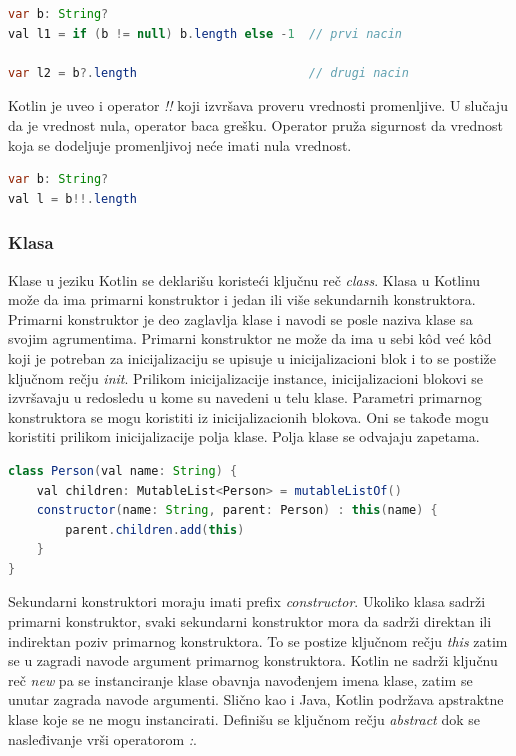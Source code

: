 \documentclass[12pt,oneside]{memoir}
\begin{document}
\begin{lstlisting}[caption={Upravljanje nula vrednostima},captionpos=t, language=Java]
var b: String?
val l1 = if (b != null) b.length else -1  // prvi nacin

var l2 = b?.length                        // drugi nacin
\end{lstlisting}

Kotlin je uveo i operator \emph{!!} koji izvršava proveru vrednosti promenljive. U slučaju da je vrednost nula, operator baca grešku. Operator pruža sigurnost da vrednost koja se dodeljuje promenljivoj neće imati nula vrednost.

\begin{lstlisting}[caption={Koršćenje operatora !!},captionpos=t, language=Java]
var b: String?
val l = b!!.length
\end{lstlisting}

\subsubsection{Klasa}
Klase u jeziku Kotlin se deklarišu koristeći ključnu reč \emph{class}. Klasa u Kotlinu može da ima primarni konstruktor i jedan ili više sekundarnih konstruktora. Primarni konstruktor je deo zaglavlja klase i navodi se posle naziva klase sa svojim agrumentima. Primarni konstruktor ne može da ima u sebi kôd već kôd koji je potreban za inicijalizaciju se upisuje u inicijalizacioni blok i to se postiže ključnom rečju \emph{init}. Prilikom inicijalizacije instance, inicijalizacioni blokovi se izvršavaju u redosledu u kome su navedeni u telu klase. Parametri primarnog konstruktora se mogu koristiti iz inicijalizacionih blokova. Oni se takođe mogu koristiti prilikom inicijalizacije polja klase. Polja klase se odvajaju zapetama. 

\begin{lstlisting}[caption={Klasa u Kotlin jeziku},captionpos=t, language=Java]
class Person(val name: String) {
    val children: MutableList<Person> = mutableListOf()
    constructor(name: String, parent: Person) : this(name) {
        parent.children.add(this)
    }
}
\end{lstlisting}

Sekundarni konstruktori moraju imati prefix \emph{constructor}. Ukoliko klasa sadrži primarni konstruktor, svaki sekundarni konstruktor mora da sadrži direktan ili indirektan poziv primarnog konstruktora. To se postize ključnom rečju \emph{this} zatim se u zagradi navode argument primarnog konstruktora. Kotlin ne sadrži ključnu reč \emph{new} pa se instanciranje klase obavnja navođenjem imena klase, zatim se unutar zagrada navode argumenti. Slično kao i Java, Kotlin podržava apstraktne klase koje se ne mogu instancirati. Definišu se ključnom rečju \emph{abstract} dok se nasleđivanje vrši operatorom \emph{:}.
\end{document}
